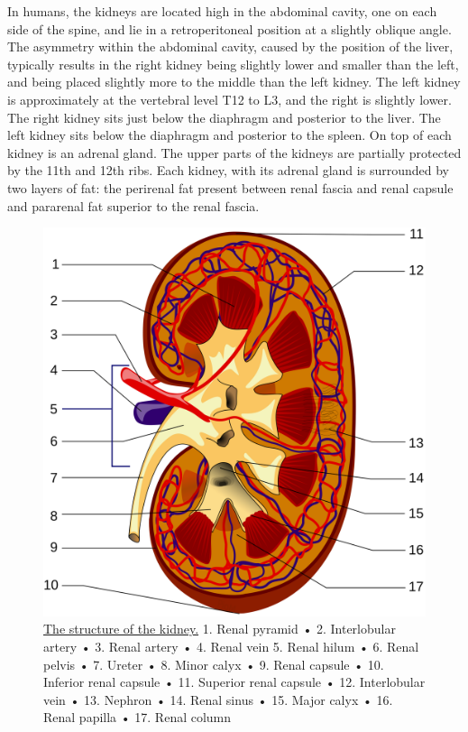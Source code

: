 In humans, the kidneys are located high in the abdominal cavity, one on each side of the spine, and lie in a retroperitoneal position at a slightly oblique angle. The asymmetry within the abdominal cavity, caused by the position of the liver, typically results in the right kidney being slightly lower and smaller than the left, and being placed slightly more to the middle than the left kidney. The left kidney is approximately at the vertebral level T12 to L3, and the right is slightly lower. The right kidney sits just below the diaphragm and posterior to the liver. The left kidney sits below the diaphragm and posterior to the spleen. On top of each kidney is an adrenal gland. The upper parts of the kidneys are partially protected by the 11th and 12th ribs. Each kidney, with its adrenal gland is surrounded by two layers of fat: the perirenal fat present between renal fascia and renal capsule and pararenal fat superior to the renal fascia.



\begin{figure}

{\centering \includegraphics[width=0.7\linewidth]{./figures/excretory/KidneyStructures_PioM} 

}

\caption{\href{https://commons.wikimedia.org/wiki/File:KidneyStructures_PioM.svg}{The structure of the kidney.} 1. Renal pyramid • 2. Interlobular artery • 3. Renal artery • 4. Renal vein 5. Renal hilum • 6. Renal pelvis • 7. Ureter • 8. Minor calyx • 9. Renal capsule • 10. Inferior renal capsule • 11. Superior renal capsule • 12. Interlobular vein • 13. Nephron • 14. Renal sinus • 15. Major calyx • 16. Renal papilla • 17. Renal column}\label{fig:kidneystructure}
\end{figure}

